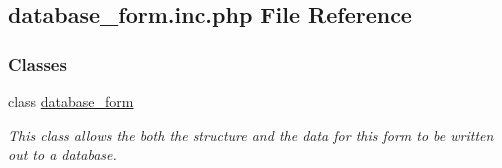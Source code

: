 \hypertarget{database__form_8inc_8php}{\subsection{database\-\_\-form.\-inc.\-php File Reference}
\label{database__form_8inc_8php}
}
\subsubsection*{Classes}
\begin{DoxyCompactItemize}
\item 
class \hyperlink{classdatabase__form}{database\-\_\-form}
\begin{DoxyCompactList}\small\item\em This class allows the both the structure and the data for this form to be written out to a database. \end{DoxyCompactList}\end{DoxyCompactItemize}

